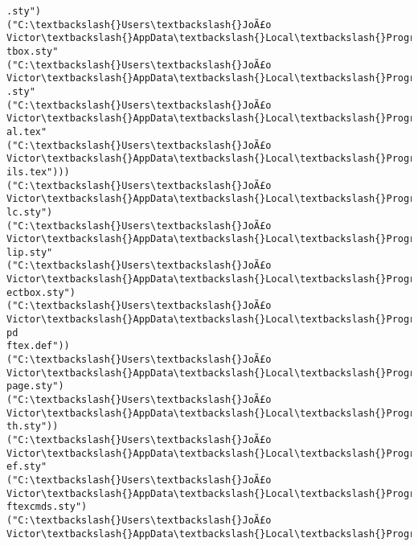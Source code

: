 \documentclass[11pt]{article}
\begin{document}
\begin{Verbatim}[commandchars=\\\{\}]
.sty")
("C:\textbackslash{}Users\textbackslash{}JoÃ£o Victor\textbackslash{}AppData\textbackslash{}Local\textbackslash{}Programs\textbackslash{}MiKTeX\textbackslash{}tex/latex/adjustbox\textbackslash{}adjus
tbox.sty"
("C:\textbackslash{}Users\textbackslash{}JoÃ£o Victor\textbackslash{}AppData\textbackslash{}Local\textbackslash{}Programs\textbackslash{}MiKTeX\textbackslash{}tex/latex/xkeyval\textbackslash{}xkeyval
.sty"
("C:\textbackslash{}Users\textbackslash{}JoÃ£o Victor\textbackslash{}AppData\textbackslash{}Local\textbackslash{}Programs\textbackslash{}MiKTeX\textbackslash{}tex/generic/xkeyval\textbackslash{}xkeyv
al.tex"
("C:\textbackslash{}Users\textbackslash{}JoÃ£o Victor\textbackslash{}AppData\textbackslash{}Local\textbackslash{}Programs\textbackslash{}MiKTeX\textbackslash{}tex/generic/xkeyval\textbackslash{}xkvut
ils.tex")))
("C:\textbackslash{}Users\textbackslash{}JoÃ£o Victor\textbackslash{}AppData\textbackslash{}Local\textbackslash{}Programs\textbackslash{}MiKTeX\textbackslash{}tex/latex/adjustbox\textbackslash{}adjca
lc.sty")
("C:\textbackslash{}Users\textbackslash{}JoÃ£o Victor\textbackslash{}AppData\textbackslash{}Local\textbackslash{}Programs\textbackslash{}MiKTeX\textbackslash{}tex/latex/adjustbox\textbackslash{}trimc
lip.sty"
("C:\textbackslash{}Users\textbackslash{}JoÃ£o Victor\textbackslash{}AppData\textbackslash{}Local\textbackslash{}Programs\textbackslash{}MiKTeX\textbackslash{}tex/latex/collectbox\textbackslash{}coll
ectbox.sty")
("C:\textbackslash{}Users\textbackslash{}JoÃ£o Victor\textbackslash{}AppData\textbackslash{}Local\textbackslash{}Programs\textbackslash{}MiKTeX\textbackslash{}tex/latex/adjustbox\textbackslash{}tc-pd
ftex.def"))
("C:\textbackslash{}Users\textbackslash{}JoÃ£o Victor\textbackslash{}AppData\textbackslash{}Local\textbackslash{}Programs\textbackslash{}MiKTeX\textbackslash{}tex/latex/ifoddpage\textbackslash{}ifodd
page.sty")
("C:\textbackslash{}Users\textbackslash{}JoÃ£o Victor\textbackslash{}AppData\textbackslash{}Local\textbackslash{}Programs\textbackslash{}MiKTeX\textbackslash{}tex/latex/varwidth\textbackslash{}varwid
th.sty"))
("C:\textbackslash{}Users\textbackslash{}JoÃ£o Victor\textbackslash{}AppData\textbackslash{}Local\textbackslash{}Programs\textbackslash{}MiKTeX\textbackslash{}tex/latex/hyperref\textbackslash{}hyperr
ef.sty"
("C:\textbackslash{}Users\textbackslash{}JoÃ£o Victor\textbackslash{}AppData\textbackslash{}Local\textbackslash{}Programs\textbackslash{}MiKTeX\textbackslash{}tex/generic/pdftexcmds\textbackslash{}pd
ftexcmds.sty")
("C:\textbackslash{}Users\textbackslash{}JoÃ£o Victor\textbackslash{}AppData\textbackslash{}Local\textbackslash{}Programs\textbackslash{}MiKTeX\textbackslash{}tex/generic/kvdefinekeys\textbackslash{}

\end{Verbatim}
\end{document}
